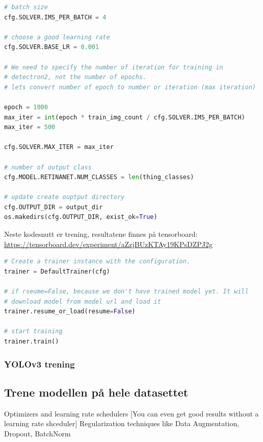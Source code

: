 \begin{lstlisting}[language=Python, caption=Konfigurasjon i train.py]
# batch size
cfg.SOLVER.IMS_PER_BATCH = 4

# choose a good learning rate
cfg.SOLVER.BASE_LR = 0.001

# We need to specify the number of iteration for training in
# detectron2, not the number of epochs.
# lets convert number of epoch to number or iteration (max iteration)

epoch = 1000
max_iter = int(epoch * train_img_count / cfg.SOLVER.IMS_PER_BATCH)
max_iter = 500

cfg.SOLVER.MAX_ITER = max_iter

# number of output class
cfg.MODEL.RETINANET.NUM_CLASSES = len(thing_classes)

# update create ouptput directory
cfg.OUTPUT_DIR = output_dir
os.makedirs(cfg.OUTPUT_DIR, exist_ok=True)

\end{lstlisting}

Neste kodesnutt er trening, resultatene finnes på tensorboard: \\
\url{https://tensorboard.dev/experiment/aZzjBUzKTAy19KPsDZPJ2g}

\begin{lstlisting}[language=Python, caption=Treningskode i train.py]
# Create a trainer instance with the configuration.
trainer = DefaultTrainer(cfg) 

# if rseume=False, because we don't have trained model yet. It will
# download model from model url and load it
trainer.resume_or_load(resume=False)

# start training
trainer.train()

\end{lstlisting}


\subsubsection{YOLOv3 trening}

\subsection{Trene modellen på hele datasettet}

Optimizers and learning rate schedulers [You can even get good results without a learning rate shceduler]
Regularization techniques like Data Augmentation, Dropout, BatchNorm

